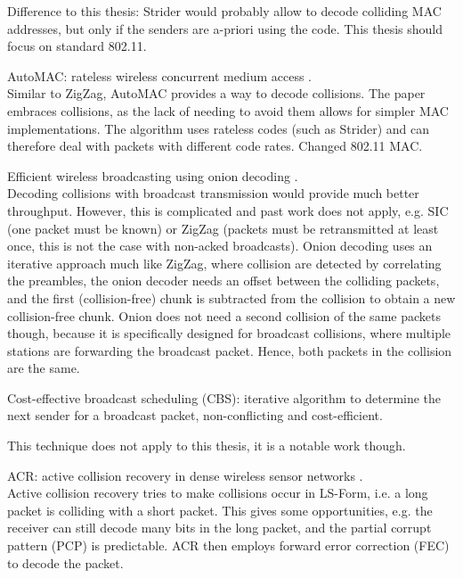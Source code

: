 Difference to this thesis: Strider would probably allow to decode colliding MAC addresses, but only if the senders are a-priori using the code. This thesis should focus on standard 802.11.

AutoMAC: rateless wireless concurrent medium access \cite{gudipati2012}.\\

Similar to ZigZag, AutoMAC provides a way to decode collisions. The paper embraces collisions, as the lack of needing to avoid them allows for simpler MAC implementations. The algorithm uses rateless codes (such as Strider) and can therefore deal with packets with different code rates. Changed 802.11 MAC.

Efficient wireless broadcasting using onion decoding \cite{wang2010}.\\

Decoding collisions with broadcast transmission would provide much better throughput. However, this is complicated and past work does not apply, e.g. SIC (one packet must be known) or ZigZag \cite{gollakota2008} (packets must be retransmitted at least once, this is not the case with non-acked broadcasts). Onion decoding uses an iterative approach much like ZigZag, where collision are detected by correlating the preambles, the onion decoder needs an offset between the colliding packets, and the first (collision-free) chunk is subtracted from the collision to obtain a new collision-free chunk. Onion does not need a second collision of the same packets though, because it is specifically designed for broadcast collisions, where multiple stations are forwarding the broadcast packet. Hence, both packets in the collision are the same.

Cost-effective broadcast scheduling (CBS): iterative algorithm to determine the next sender for a broadcast packet, non-conflicting and cost-efficient.

This technique does not apply to this thesis, it is a notable work though.

ACR: active collision recovery in dense wireless sensor networks \cite{wu2010}.\\

Active collision recovery tries to make collisions occur in LS-Form, i.e. a long packet is colliding with a short packet. This gives some opportunities, e.g. the receiver can still decode many bits in the long packet, and the partial corrupt pattern (PCP) is predictable. ACR then employs forward error correction (FEC) to decode the packet.

